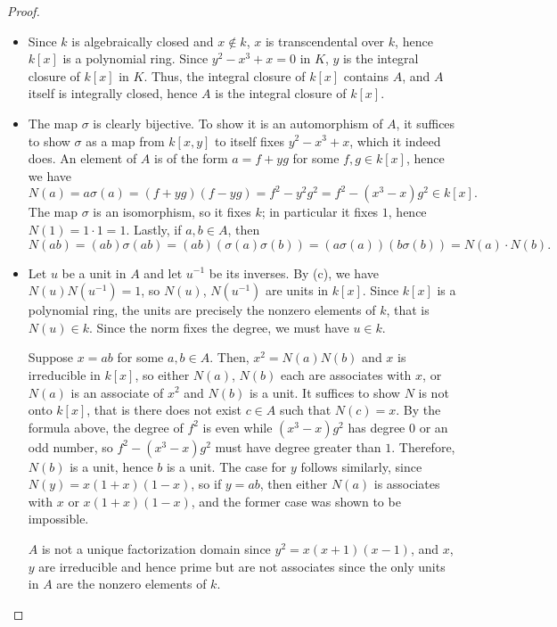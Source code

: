 \documentclass[a4paper]{article}
\begin{document}
\begin{enumerate} [label=\textbf{\arabic*.}, leftmargin=0cm]
\begin{proof}
\begin{itemize} [leftmargin=0cm]
    \item[(b)] Since $k$ is algebraically closed and $x \notin k$, $x$ is transcendental over $k$, hence $k[x]$ is a polynomial ring. Since $y^2 - x^3 + x = 0$ in $K$, $y$ is the integral closure of $k[x]$ in $K$. Thus, the integral closure of $k[x]$ contains $A$, and $A$ itself is integrally closed, hence $A$ is the integral closure of $k[x]$.

    \item[(c)] The map $\sigma$ is clearly bijective. To show it is an automorphism of $A$, it suffices to show $\sigma$ as a map from $k[x, y]$ to itself fixes $y^2 - x^3 + x$, which it indeed does. An element of $A$ is of the form $a = f + yg$ for some $f, g \in k[x]$, hence we have
    \begin{equation*}
      N(a) = a \sigma(a) = (f + yg)(f - yg) = f^2 - y^2g^2 = f^2 - (x^3 - x)g^2 \in k[x].
    \end{equation*}
    The map $\sigma$ is an isomorphism, so it fixes $k$; in particular it fixes $1$, hence $N(1) = 1 \cdot 1 = 1$. Lastly, if $a, b \in A$, then
    \begin{equation*}
      N(ab) = (ab) \sigma(ab) = (ab)(\sigma(a) \sigma(b)) = (a \sigma(a))(b \sigma(b)) = N(a) \cdot N(b).
    \end{equation*}

    \item[(d)] Let $u$ be a unit in $A$ and let $u^{-1}$ be its inverses. By (c), we have $N(u) N(u^{-1}) = 1$, so $N(u)$, $N(u^{-1})$ are units in $k[x]$.
    Since $k[x]$ is a polynomial ring, the units are precisely the nonzero elements of $k$, that is $N(u) \in k$.
    Since the norm fixes the degree, we must have $u \in k$.

    Suppose $x = ab$ for some $a, b \in A$.
    Then, $x^2 = N(a) N(b)$ and $x$ is irreducible in $k[x]$, so either $N(a)$, $N(b)$ each are associates with $x$, or $N(a)$ is an associate of $x^2$ and $N(b)$ is a unit. It suffices to show $N$ is not onto $k[x]$, that is there does not exist $c \in A$ such that $N(c) = x$.
    By the formula above, the degree of $f^2$ is even while $(x^3 - x)g^2$ has degree $0$ or an odd number, so $f^2 - (x^3 - x)g^2$ must have degree greater than $1$. Therefore, $N(b)$ is a unit, hence $b$ is a unit. The case for $y$ follows similarly, since $N(y) = x(1 + x)(1 - x)$, so if $y = ab$, then either $N(a)$ is associates with $x$ or $x(1 + x)(1 - x)$, and the former case was shown to be impossible.
    
    $A$ is not a unique factorization domain since $y^2 = x(x + 1)(x - 1)$, and $x$, $y$ are irreducible and hence prime but are not associates since the only units in $A$ are the nonzero elements of $k$.
  \end{itemize}
\end{proof}


\end{enumerate}
\end{document}
